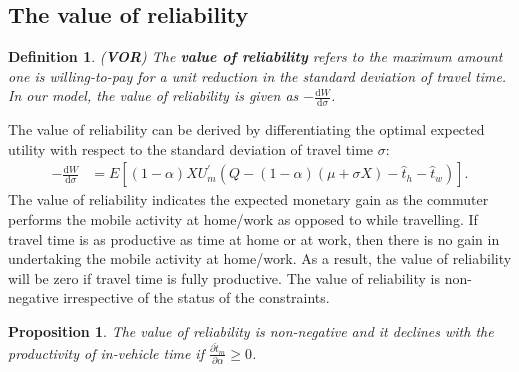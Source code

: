 \documentclass[12pt,a4paper,british]{article}
\newtheorem{definition}{Definition}[section]
\newtheorem{prop}{Proposition}[section]
\begin{document}
\subsection*{The value of reliability }
\begin{definition}
(\textbf{VOR}) The \textbf{\textit{value of reliability}} refers to the maximum amount one is willing-to-pay for a unit reduction in the standard deviation of travel time. In our model, the value of reliability is given as $-\frac{\mathrm{d}W}{\mathrm{d}\sigma}$.
\end{definition}
The value of reliability can be derived by differentiating the optimal expected utility with respect to the standard deviation of travel time $\sigma$: 
\begin{align*}
-\frac{\mathrm{d}W}{\mathrm{d}\sigma} & =E\left[\left( 1 - \alpha \right) X U_{m}^{\prime} \left(Q - \left(1 - \alpha\right) \left(\mu + \sigma X \right) - \hat{t}_{h} - \hat{t}_{w}\right)\right].
\end{align*}
The value of reliability indicates the expected monetary gain as the commuter performs the mobile activity at home/work as opposed to while travelling. If travel time is as productive as time at home or at work, then there is no gain in undertaking the mobile activity at home/work. As a result, the value of reliability will be zero if travel time is fully productive. The value of reliability is non-negative irrespective of the status of the constraints.

\begin{prop}
The value of reliability is non-negative and it declines with the productivity of in-vehicle time if $\frac{\partial\hat{t}_{m}}{\partial\alpha}\geq0$. 
\end{prop}
\end{document}
